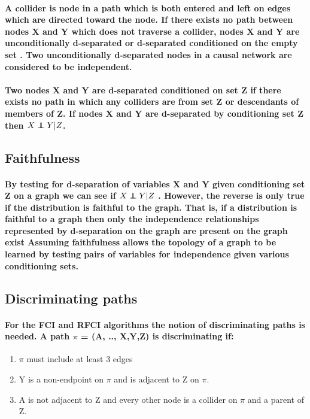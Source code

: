 \documentclass{article}
\newcommand\independent{\protect\mathpalette{\protect\independenT}{\perp}}
\def\independenT#1#2{\mathrel{\rlap{$#1#2$}\mkern2mu{#1#2}}}
\begin{document}
\paragraph{A collider is node in a path which is both entered and left on edges which are directed toward the node. If there exists no path between nodes X and Y which does not traverse a collider, nodes X and Y are unconditionally d-separated or d-separated conditioned on the empty set \cite{pearl2003causality}. Two unconditionally d-separated nodes in a causal network are considered to be independent\cite{pearl2009}.
}
\paragraph{Two nodes X and Y are d-separated conditioned on set Z if there exists no path in which any colliders are from set Z or descendants of members of Z\cite{pearl2003causality}. If nodes X and Y are d-separated by conditioning set Z then $X \independent Y | Z$.\cite{pearl2009}}


\subsection{Faithfulness}


\paragraph{By testing for d-separation of variables X and Y given conditioning set Z on a graph we can see if $X \independent Y | Z$ \cite{pearl2009}. However, the reverse is only true if the distribution is faithful to the graph. That is, if a distribution is faithful to a graph then only the independence relationships represented by d-separation on the graph are present on the graph exist \cite{scheines1997introduction} Assuming faithfulness allows the topology of a graph to be learned by testing pairs of variables for independence given various conditioning sets.}

\subsection{Discriminating paths}
\paragraph{For the FCI and RFCI algorithms the notion of discriminating paths is needed. A path $\pi$ = (A, .., X,Y,Z) is discriminating if:}
\begin{enumerate}
\item $\pi$ must include at least 3 edges
\item Y is a non-endpoint on $\pi$ and is adjacent to Z on $\pi$.
\item A is not adjacent to Z and every other node is a collider on $\pi$ and a parent of Z. \cite{colombo2012learning} 
\end{enumerate}
\end{document}
